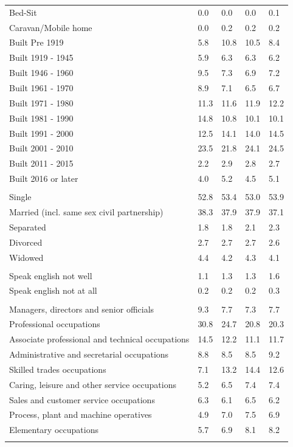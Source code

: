\documentclass{article}
\begin{document}
\begin{table}[h]
\begin{tabular}{KTTTT}
Bed-Sit & 0.0& 0.0& 0.0& 0.1\\
Caravan/Mobile home & 0.0& 0.2& 0.2& 0.2\\
    \hline
Built Pre 1919 &  5.8& 10.8& 10.5&  8.4\\
Built 1919 - 1945 & 5.9& 6.3& 6.3& 6.2\\
Built  1946 - 1960 & 9.5& 7.3& 6.9& 7.2\\
Built  1961 - 1970 & 8.9& 7.1& 6.5& 6.7\\
Built  1971 - 1980 & 11.3& 11.6& 11.9& 12.2\\
Built  1981 - 1990 & 14.8& 10.8& 10.1& 10.1\\
Built  1991 - 2000 & 12.5& 14.1& 14.0& 14.5\\
Built  2001 - 2010 & 23.5& 21.8& 24.1& 24.5\\
Built  2011 - 2015 & 2.2& 2.9& 2.8& 2.7\\
Built  2016 or later & 4.0& 5.2& 4.5& 5.1\\
\hline
    \\
    \hline
Single & 52.8& 53.4& 53.0& 53.9\\
Married (incl. same sex civil partnership) & 38.3& 37.9& 37.9& 37.1\\
Separated  & 1.8& 1.8& 2.1& 2.3\\
Divorced  & 2.7& 2.7& 2.7& 2.6\\
Widowed & 4.4& 4.2& 4.3& 4.1\\
\hline
    \\ 
    \hline
Speak english not well & 1.1& 1.3& 1.3& 1.6\\
Speak english not at all & 0.2& 0.2& 0.2& 0.3\\
\hline
    \\
    \hline
Managers, directors and senior officials & 9.3& 7.7& 7.3& 7.7\\
Professional occupations & 30.8& 24.7& 20.8& 20.3\\
Associate professional and technical occupations & 14.5& 12.2& 11.1& 11.7\\
Administrative and secretarial occupations & 8.8& 8.5& 8.5& 9.2\\
Skilled trades occupations &  7.1& 13.2& 14.4& 12.6\\
Caring, leisure and other service occupations & 5.2& 6.5& 7.4& 7.4\\
Sales and customer service occupations & 6.3& 6.1& 6.5& 6.2\\
Process, plant and machine operatives & 4.9& 7.0& 7.5& 6.9\\
Elementary occupations & 5.7& 6.9& 8.1& 8.2\\
\hline
\end{tabular}
\end{table}
\end{document}
